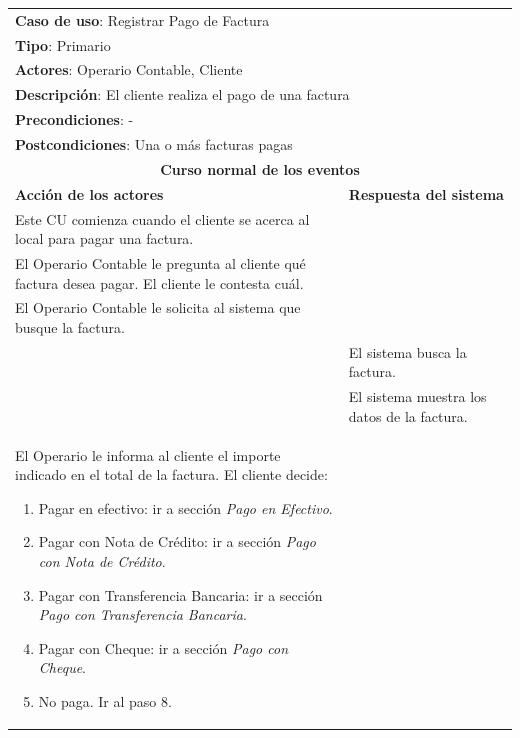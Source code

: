 \documentclass[12pt]{extarticle}
\begin{document}
\begin{spacing}{1.2}
    \setcounter{step}{0}

	\begin{longtable}{ |p{8cm}|p{8cm}| }
		\hline
		\multicolumn{2}{|p{16cm}|}{\textbf{Caso de uso}: Registrar Pago de Factura}\\
		\multicolumn{2}{|p{16cm}|}{\textbf{Tipo}: Primario}\\
		\multicolumn{2}{|p{16cm}|}{\textbf{Actores}: Operario Contable, Cliente}\\
		\multicolumn{2}{|p{16cm}|}{\textbf{Descripción}: El cliente realiza el pago de una factura}\\
		\multicolumn{2}{|p{16cm}|}{\textbf{Precondiciones}: -}\\
		\multicolumn{2}{|p{16cm}|}{\textbf{Postcondiciones}: Una o más facturas pagas}\\
		\hline
		\multicolumn{2}{|c|}{\textbf{Curso normal de los eventos}}\\
		\hline
		\textbf{Acción de los actores} & \textbf{Respuesta del sistema}\\
		\hline
			\inc Este CU comienza cuando el cliente se acerca al local para pagar una factura.& \\
            \hline
			\inc El Operario Contable le pregunta al cliente qué factura desea pagar. El cliente le contesta cuál. & \\
            \hline
			\inc El Operario Contable le solicita al sistema que busque la factura. & \\
            \hline
			& \inc El sistema busca la factura. \\
            \hline
			& \inc El sistema muestra los datos de la factura. \\
            \hline
			\inc El Operario le informa al cliente el importe indicado en el total de la factura. El cliente decide:
                \begin{enumerate}[label=(\alph*)]
                    \item Pagar en efectivo: ir a sección \textit{Pago en Efectivo}.
                    \item Pagar con Nota de Crédito: ir a sección \textit{Pago con Nota de Crédito}.
                    \item Pagar con Transferencia Bancaria: ir a sección \textit{Pago con Transferencia Bancaria}.
                    \item Pagar con Cheque: ir a sección \textit{Pago con Cheque}.
                    \item No paga. Ir al paso 8.

\end{enumerate}
\end{longtable}
\end{spacing}
\end{document}
